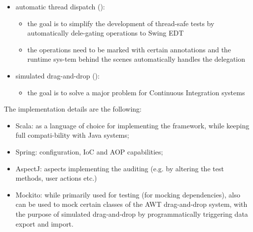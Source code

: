 \begin{itemize}
\item automatic thread dispatch ():
	\begin{itemize}
	\item the goal is to simplify the development of thread-safe tests by automatically dele-gating operations to Swing EDT
	\item the operations need to be marked with certain annotations and the runtime sys-tem behind the scenes automatically handles the delegation
	\end{itemize}

\item simulated drag-and-drop ():
	\begin{itemize}
	\item the goal is to solve a major problem for Continuous Integration systems
	\end{itemize}
\end{itemize}

\noindent The implementation details are the following:

\begin{itemize}
\item Scala: as a language of choice for implementing the framework, while keeping full compati-bility with Java systems;
\item Spring: configuration, IoC and AOP capabilities;
\item AspectJ: aspects implementing the auditing (e.g. by altering the test methods, user actions etc.)
\item Mockito: while primarily used for testing (for mocking dependencies), also can be used to mock certain classes of the AWT drag-and-drop system, with the purpose of simulated drag-and-drop by programmatically triggering data export and import.
\end{itemize}
